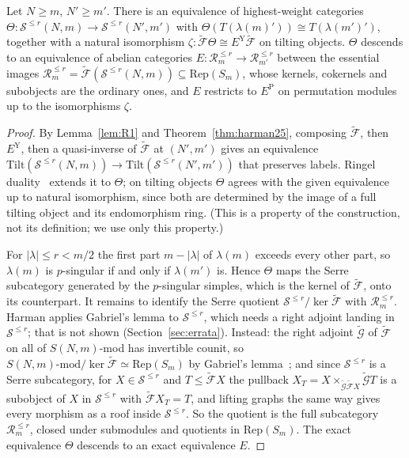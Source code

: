 \begin{proposition}\label{prop:harman-eq}
Let $N\ge m$, $N'\ge m'$.  There is an equivalence of highest-weight categories
$\Theta\colon\mathcal S^{\le r}(N,m)\to\mathcal S^{\le r}(N',m')$ with
$\Theta(T(\lambda(m)'))\cong T(\lambda(m')')$, together with a natural isomorphism
$\zeta\colon\tilde{\mathcal F}\Theta\cong E^{\mathrm Y}\tilde{\mathcal F}$ on tilting objects.
$\Theta$ descends to an equivalence of abelian categories
$E\colon\mathcal R^{\le r}_m\to\mathcal R^{\le r}_{m'}$ between the essential images
$\mathcal R^{\le r}_m=\tilde{\mathcal F}(\mathcal S^{\le r}(N,m))\subseteq\mathrm{Rep}(S_m)$,
whose kernels, cokernels and subobjects are the ordinary ones, and $E$ restricts to
$E^{\mathrm P}$ on permutation modules up to the isomorphisms $\zeta$.
\end{proposition}

\begin{proof}
By Lemma~\ref{lem:R1} and Theorem~\ref{thm:harman25}, composing $\tilde{\mathcal F}$, then
$E^{\mathrm Y}$, then a quasi-inverse of $\tilde{\mathcal F}$ at $(N',m')$ gives an equivalence
$\mathrm{Tilt}(\mathcal S^{\le r}(N,m))\to\mathrm{Tilt}(\mathcal S^{\le r}(N',m'))$ that
preserves labels.  Ringel duality~\cite[Cor.~1.6]{harman2015} extends it to $\Theta$; on
tilting objects $\Theta$ agrees with the given equivalence up to natural isomorphism, since
both are determined by the image of a full tilting object and its endomorphism ring.  (This is
a property of the construction, not its definition; we use only this property.)

For $|\lambda|\le r<m/2$ the first part $m-|\lambda|$ of $\lambda(m)$ exceeds every other
part, so $\lambda(m)$ is $p$-singular if and only if $\lambda(m')$ is.  Hence $\Theta$ maps the
Serre subcategory generated by the $p$-singular simples, which is the kernel of
$\tilde{\mathcal F}$, onto its counterpart.  It remains to identify the Serre quotient
$\mathcal S^{\le r}/\ker\tilde{\mathcal F}$ with $\mathcal R^{\le r}_m$.  Harman applies
Gabriel's lemma to $\mathcal S^{\le r}$, which needs a right adjoint landing in
$\mathcal S^{\le r}$; that is not shown (Section~\ref{sec:errata}).  Instead: the right adjoint
$\tilde{\mathcal G}$ of $\tilde{\mathcal F}$ on all of $S(N,m)$-mod has invertible counit, so
$S(N,m)\text{-mod}/\ker\tilde{\mathcal F}\simeq\mathrm{Rep}(S_m)$ by Gabriel's
lemma~\cite{gabriel1962}; and since $\mathcal S^{\le r}$ is a Serre subcategory, for
$X\in\mathcal S^{\le r}$ and $T\le\tilde{\mathcal F}X$ the pullback
$X_T=X\times_{\tilde{\mathcal G}\tilde{\mathcal F}X}\tilde{\mathcal G}T$ is a subobject of $X$
in $\mathcal S^{\le r}$ with $\tilde{\mathcal F}X_T=T$, and lifting graphs the same way gives
every morphism as a roof inside $\mathcal S^{\le r}$.  So the quotient is the full subcategory
$\mathcal R^{\le r}_m$, closed under submodules and quotients in $\mathrm{Rep}(S_m)$.  The
exact equivalence $\Theta$ descends to an exact equivalence $E$.
\end{proof}

